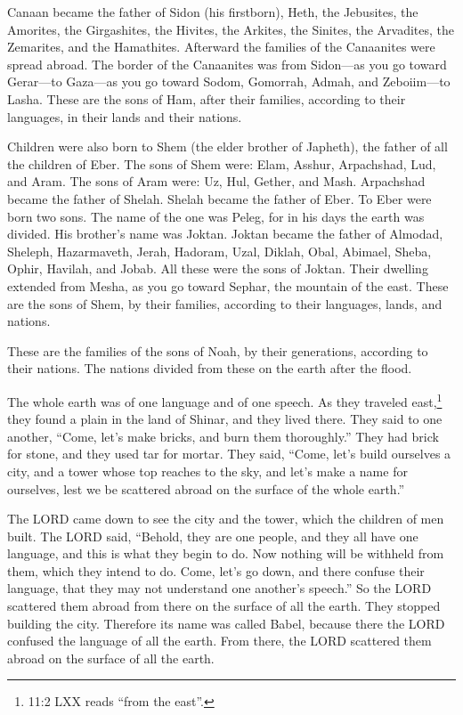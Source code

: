 \myverse{}Canaan became the father of Sidon (his firstborn), Heth, \myverse{}the Jebusites, the Amorites, the Girgashites, \myverse{} the Hivites, the Arkites, the Sinites, \myverse{}the Arvadites, the Zemarites, and the Hamathites. Afterward the families of the Canaanites were spread abroad. \myverse{}The border of the Canaanites was from Sidon—as you go toward Gerar—to Gaza—as you go toward Sodom, Gomorrah, Admah, and Zeboiim—to Lasha. \myverse{}These are the sons of Ham, after their families, according to their languages, in their lands and their nations.

\myverse{}Children were also born to Shem (the elder brother of Japheth), the father of all the children of Eber. \myverse{}The sons of Shem were: Elam, Asshur, Arpachshad, Lud, and Aram. \myverse{}The sons of Aram were: Uz, Hul, Gether, and Mash. \myverse{}Arpachshad became the father of Shelah. Shelah became the father of Eber. \myverse{}To Eber were born two sons. The name of the one was Peleg, for in his days the earth was divided. His brother’s name was Joktan. \myverse{}Joktan became the father of Almodad, Sheleph, Hazarmaveth, Jerah, \myverse{}Hadoram, Uzal, Diklah, \myverse{}Obal, Abimael, Sheba, \myverse{}Ophir, Havilah, and Jobab. All these were the sons of Joktan. \myverse{}Their dwelling extended from Mesha, as you go toward Sephar, the mountain of the east. \myverse{}These are the sons of Shem, by their families, according to their languages, lands, and nations.

\myverse{}These are the families of the sons of Noah, by their generations, according to their nations. The nations divided from these on the earth after the flood.

\mychapter{}
\myverse*{}The whole earth was of one language and of one speech. \myverse{}As they traveled east,\footnote{11:2 LXX reads “from the east”.} they found a plain in the land of Shinar, and they lived there.  \myverse{}They said to one another, “Come, let’s make bricks, and burn them thoroughly.” They had brick for stone, and they used tar for mortar.  \myverse{}They said, “Come, let’s build ourselves a city, and a tower whose top reaches to the sky, and let’s make a name for ourselves, lest we be scattered abroad on the surface of the whole earth.”

\myverse{}The LORD came down to see the city and the tower, which the children of men built.  \myverse{}The LORD said, “Behold, they are one people, and they all have one language, and this is what they begin to do. Now nothing will be withheld from them, which they intend to do.  \myverse{}Come, let’s go down, and there confuse their language, that they may not understand one another’s speech.”  \myverse{}So the LORD scattered them abroad from there on the surface of all the earth. They stopped building the city.  \myverse{}Therefore its name was called Babel, because there the LORD confused the language of all the earth. From there, the LORD scattered them abroad on the surface of all the earth.

